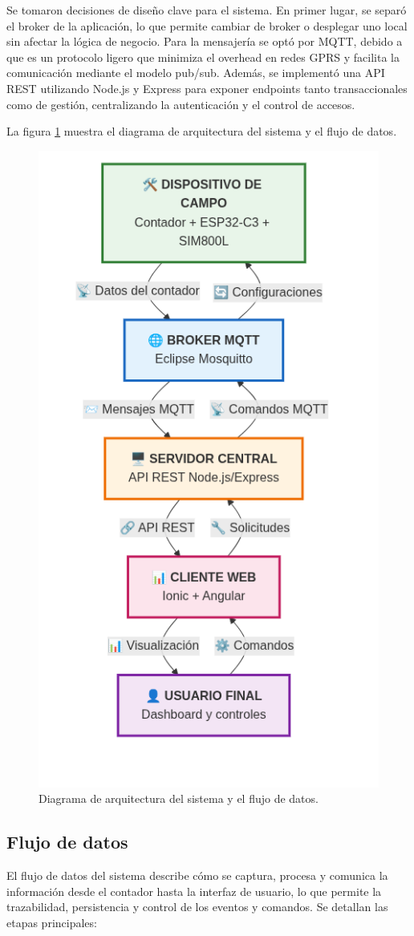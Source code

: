 Se tomaron decisiones de diseño clave para el sistema. En primer lugar, se separó el broker de la aplicación, lo que permite cambiar de broker o desplegar uno local sin afectar la lógica de negocio. Para la mensajería se optó por MQTT, debido a que es un protocolo ligero que minimiza el overhead en redes GPRS y facilita la comunicación mediante el modelo pub/sub. Además, se implementó una API REST utilizando Node.js y Express para exponer endpoints tanto transaccionales como de gestión, centralizando la autenticación y el control de accesos.


La figura \ref{fig:diag_arquitectura} muestra el diagrama de arquitectura del sistema y el flujo de datos.


\begin{figure}[H]
  \centering
  \includegraphics[width=0.5\linewidth]{./Figures/diagArq.png}
  \caption{Diagrama de arquitectura del sistema y el flujo de datos.}
  \label{fig:diag_arquitectura}
\end{figure}



\subsection{Flujo de datos} 
El flujo de datos del sistema describe cómo se captura, procesa y comunica la información desde el contador hasta la interfaz de usuario, lo que permite la trazabilidad, persistencia y control de los eventos y comandos. Se detallan las etapas principales:

